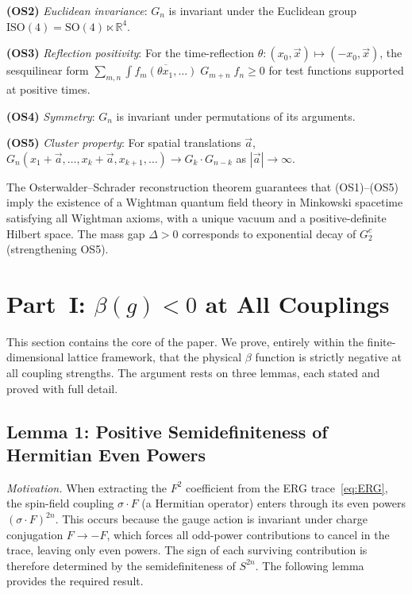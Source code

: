 \documentclass[12pt,a4paper]{article}
\theoremstyle{plain}
\theoremstyle{definition}
\theoremstyle{remark}
\begin{document}
\noindent\textbf{(OS2)} \textit{Euclidean invariance}: $G_n$ is invariant under the Euclidean group $\mathrm{ISO}(4)=\mathrm{SO}(4)\ltimes\mathbb{R}^4$.

\noindent\textbf{(OS3)} \textit{Reflection positivity}: For the time-reflection $\theta:(x_0,\vec{x})\mapsto(-x_0,\vec{x})$, the sesquilinear form $\sum_{m,n}\int\overline{f_m(\theta x_1,\ldots)}\;G_{m+n}\;f_n\geq 0$ for test functions supported at positive times.

\noindent\textbf{(OS4)} \textit{Symmetry}: $G_n$ is invariant under permutations of its arguments.

\noindent\textbf{(OS5)} \textit{Cluster property}: For spatial translations $\vec{a}$, $G_n(x_1+\vec{a},\ldots,x_k+\vec{a},x_{k+1},\ldots)\to G_k\cdot G_{n-k}$ as $|\vec{a}|\to\infty$.

The Osterwalder--Schrader reconstruction theorem guarantees that (OS1)--(OS5) imply the existence of a Wightman quantum field theory in Minkowski spacetime satisfying all Wightman axioms, with a unique vacuum and a positive-definite Hilbert space. The mass gap $\Delta>0$ corresponds to exponential decay of $G_2^c$ (strengthening OS5).

\section{Part~I: $\beta(g)<0$ at All Couplings}\label{sec:betaneg}

This section contains the core of the paper. We prove, entirely within the finite-dimensional lattice framework, that the physical $\beta$ function is strictly negative at all coupling strengths. The argument rests on three lemmas, each stated and proved with full detail.

\subsection{Lemma 1: Positive Semidefiniteness of Hermitian Even Powers}\label{sec:lemma1}

\textit{Motivation.} When extracting the $F^2$ coefficient from the ERG trace~\eqref{eq:ERG}, the spin-field coupling $\sigma\cdot F$ (a Hermitian operator) enters through its even powers $(\sigma\cdot F)^{2n}$. This occurs because the gauge action is invariant under charge conjugation $F\to-F$, which forces all odd-power contributions to cancel in the trace, leaving only even powers. The sign of each surviving contribution is therefore determined by the semidefiniteness of $S^{2n}$. The following lemma provides the required result.
\end{document}

